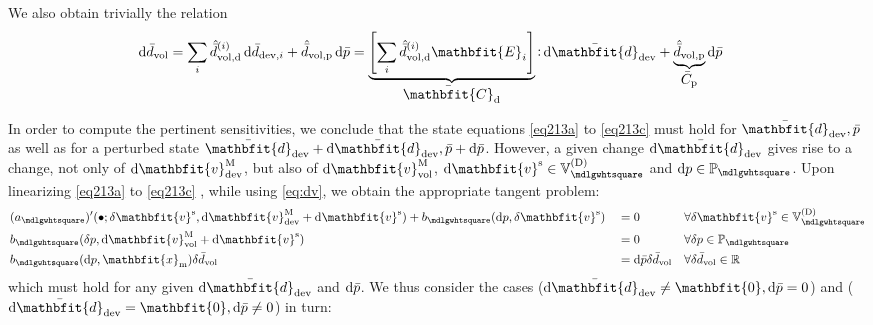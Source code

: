 \documentclass[10pt,a4paper]{article}
\renewcommand{\ta}[1]{\mathbfit{#1}}
\renewcommand{\ts}[1]{\mathbfit{#1}}
\renewcommand{\Box}{\mdlgwhtsquare}
\newcommand{\ded}{\mathrm{d}}
\newcommand{\dep}{\mathrm{p}}
\begin{document}
We also obtain trivially the relation
\begin{align}
    \dif\bar{d}_\vol
    & = \sum_{i}\hat{\bar{d}}^{(i)}_{\vol,\ded}\dif\bar{d}_{\dev,i} + \hat{\bar{d}}_{\vol,\dep}\dif\bar{p}
      = \underbrace{\left[\sum_{i}\hat{\bar{d}}^{(i)}_{\vol,\ded} \ts E_i\right]}_{\displaystyle\bar{\ts C}_\ded} \dprod\dif\bar{\ts d}_{\dev} + \underbrace{\hat{\bar{d}}_{\vol,\dep}}_{\displaystyle\bar{C}_\dep}\dif\bar{p}
    \label{eq220}
\end{align}

In order to compute the pertinent sensitivities, we conclude that the state equations \eqref{eq213a} to \eqref{eq213c} must hold
for $\bar{\ts d}_\dev,\bar{p}$ as well as for a perturbed state $\bar{\ts d}_\dev+\dif\bar{\ts d}_\dev, \bar{p}+\dif\bar{p}$.
However, a given change $\dif\bar{\ts d}_\dev$ gives rise to a change, not only of $\dif\ta{v}^\macro_\dev$,
but also of $\dif\ta{v}^\macro_\vol$, $\dif\ta{v}^\fluct\in\set{V}_\Box^{(\Dirichlet)}$ and $\dif p\in\set{P}_\Box$.
Upon linearizing \eqref{eq213a} to \eqref{eq213c} , while using \eqref{eq:dv}, we obtain the appropriate tangent problem:
\begin{align}
    &(a_\Box)'(\bullet;\delta\ta{v}^\fluct,\dif\ta{v}^\macro_\dev + \dif\ta{v}^\fluct) +
    b_\Box(\dif p,\delta\ta{v}^\fluct)
    && =
    0
    && \forall \delta \ta{v}^\fluct\in\set{V}_\Box^{(\Dirichlet)}
 \\
    &b_\Box(\delta p,\dif\ta{v}^\macro_\vol + \dif\ta{v}^\fluct)
    && =
    0
    && \forall \delta p\in\set{P}_\Box
\\
    &b_\Box(\dif p,\ta{x}_\mean)\delta\bar{d}_\vol
    && =
    \dif\bar{p}\delta\bar{d}_\vol
    && \forall \delta\bar{d}_\vol  \in \set{R}
\end{align}
which must hold for any given $\dif\bar{\ts d}_\dev$ and $\operatorname{d \!}\bar{p}$. We thus consider the cases ($\dif\bar{\ts d}_\dev\neq \ts{0}, \dif\bar{p}=0$) and ($\dif\bar{\ts d}_\dev=\ts{0}, \dif\bar{p}\neq 0$) in turn:
\end{document}
